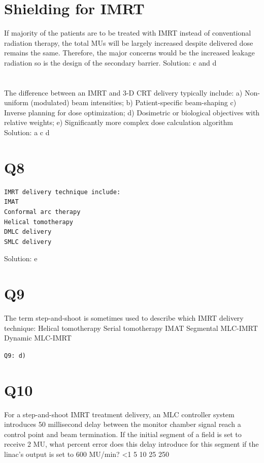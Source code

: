 \documentclass[]{book}
\theoremstyle{definition}
\theoremstyle{definition}
\theoremstyle{definition}
\theoremstyle{remark}
\begin{document}
\section{Shielding for IMRT}\label{shielding-for-imrt}

If majority of the patients are to be treated with IMRT instead of
conventional radiation therapy, the total MUs will be largely increased
despite delivered dose remains the same. Therefore, the major concerns
would be the increased leakage radiation so is the design of the
secondary barrier. Solution: c and d

\section{}\label{section}

The difference between an IMRT and 3-D CRT delivery typically include:
a) Non-uniform (modulated) beam intensities; b) Patient-specific
beam-shaping c) Inverse planning for dose optimization; d) Dosimetric or
biological objectives with relative weights; e) Significantly more
complex dose calculation algorithm Solution: a c d

\section{Q8}\label{q8}

\begin{verbatim}
IMRT delivery technique include:
IMAT
Conformal arc therapy
Helical tomotherapy
DMLC delivery
SMLC delivery
\end{verbatim}

Solution: e

\section{Q9}\label{q9}

The term step-and-shoot is sometimes used to describe which IMRT
delivery technique: Helical tomotherapy Serial tomotherapy IMAT
Segmental MLC-IMRT Dynamic MLC-IMRT

\texttt{Q9:\ d)}

\section{Q10}\label{q10}

For a step-and-shoot IMRT treatment delivery, an MLC controller system
introduces 50 millisecond delay between the monitor chamber signal reach
a control point and beam termination. If the initial segment of a field
is set to receive 2 MU, what percent error does this delay introduce for
this segment if the linac's output is set to 600 MU/min? \textless{}1 5
10 25 250
\end{document}
